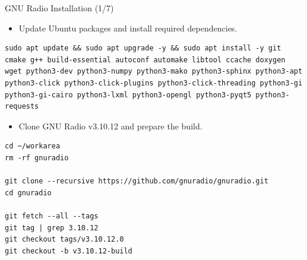 \begin{frame}[fragile]{GNU Radio Installation (1/7)}
\vspace{-0.7cm}
\footnotesize

\begin{itemize}
    \item Update Ubuntu packages and install required dependencies.
\end{itemize}
\scriptsize
\begin{Verbatim}[xleftmargin=2.8em,breaklines,breaksymbolleft={},breaksymbolright={}]
sudo apt update && sudo apt upgrade -y && sudo apt install -y git cmake g++ build-essential autoconf automake libtool ccache doxygen wget python3-dev python3-numpy python3-mako python3-sphinx python3-apt python3-click python3-click-plugins python3-click-threading python3-gi python3-gi-cairo python3-lxml python3-opengl python3-pyqt5 python3-requests
\end{Verbatim}
\begin{itemize}
    \item Clone GNU Radio v3.10.12 and prepare the build.
\end{itemize}

\scriptsize
\begin{Verbatim}[xleftmargin=2.8em,breaklines,breaksymbolleft={},breaksymbolright={}]
cd ~/workarea
rm -rf gnuradio

git clone --recursive https://github.com/gnuradio/gnuradio.git
cd gnuradio

git fetch --all --tags
git tag | grep 3.10.12
git checkout tags/v3.10.12.0
git checkout -b v3.10.12-build
\end{Verbatim}
\end{frame}